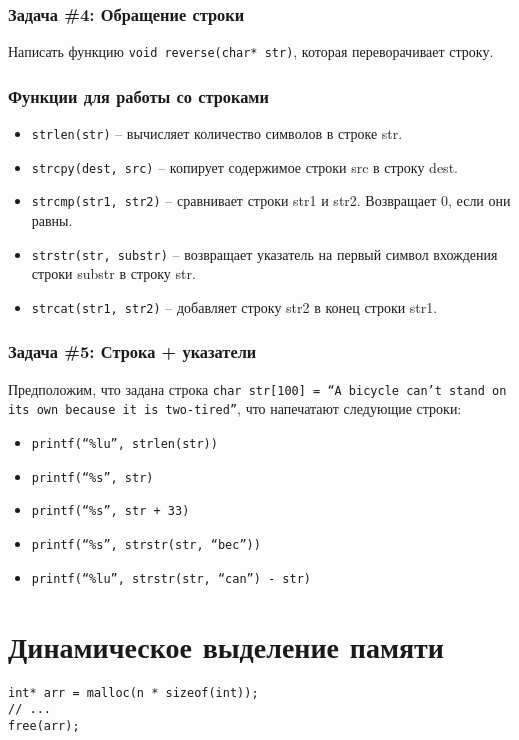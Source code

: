 \documentclass{article}
\begin{document}
\subsubsection*{\Squarepipe \quad Задача \#4: Обращение строки}
Написать функцию \texttt{void reverse(char* str)}, которая переворачивает строку.

\subsubsection*{Функции для работы со строками}
\begin{itemize}
\item \texttt{strlen(str)} -- вычисляет количество символов в строке str.
\item \texttt{strcpy(dest, src)} -- копирует содержимое строки src в строку dest.
\item \texttt{strcmp(str1, str2)} -- сравнивает строки str1 и str2. Возвращает 0, если они равны.
\item \texttt{strstr(str, substr)} --  возвращает указатель на первый символ вхождения строки substr в строку str.
\item \texttt{strcat(str1, str2)} -- добавляет строку str2 в конец строки str1.
\end{itemize}
\subsubsection*{\Squarepipe \quad Задача \#5: Строка + указатели} Предположим, что задана строка \texttt{char str[100] = ``A bicycle can't stand on its own because it is two-tired''}, что напечатают следующие строки:
\begin{multicols}{2}
\begin{itemize}
\item \texttt{printf(``\%lu'', strlen(str))}
\item \texttt{printf(``\%s'', str)}
\item \texttt{printf(``\%s'', str + 33)}
\item \texttt{printf(``\%s'', strstr(str, ``bec''))}
\item \texttt{printf(``\%lu'', strstr(str, ``can'') - str)}
\end{itemize}
\end{multicols}

\newpage

\section*{Динамическое выделение памяти}
\begin{lstlisting}
int* arr = malloc(n * sizeof(int));
// ...  
free(arr);
\end{lstlisting}
\end{document}
